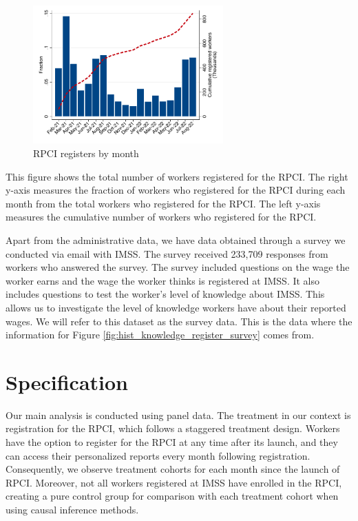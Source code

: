 \documentclass[10pt, oneside]{book}
\begin{document}
\begin{figure}[H]
    \caption{RPCI registers by month}
    \label{hist_download}
    \begin{center}
    \includegraphics[width=0.65\textwidth]{04_Figures/muestra_1porciento/hist_download_month.pdf}
    \end{center}
\end{figure}
\scriptsize{
\noindent This figure shows the total number of workers registered for the RPCI. The right y-axis measures the fraction of workers who registered for the RPCI during each month from the total workers who registered for the RPCI. The left y-axis measures the cumulative number of workers who registered for the RPCI.
} \\

\normalsize

Apart from the administrative data, we have data obtained through a survey we conducted via email with IMSS. The survey received 233,709 responses from workers who answered the survey. The survey included questions on the wage the worker earns and the wage the worker thinks is registered at IMSS. It also includes questions to test the worker's level of knowledge about IMSS. This allows us to investigate the level of knowledge workers have about their reported wages. We will refer to this dataset as the survey data. This is the data where the information for Figure \ref{fig:hist_knowledge_register_survey} comes from.


\chapter{Specification} \label{specification}

Our main analysis is conducted using panel data. The treatment in our context is registration for the RPCI, which follows a staggered treatment design. Workers have the option to register for the RPCI at any time after its launch, and they can access their personalized reports every month following registration. Consequently, we observe treatment cohorts for each month since the launch of RPCI. Moreover, not all workers registered at IMSS have enrolled in the RPCI, creating a pure control group for comparison with each treatment cohort when using causal inference methods. \\
\end{document}
